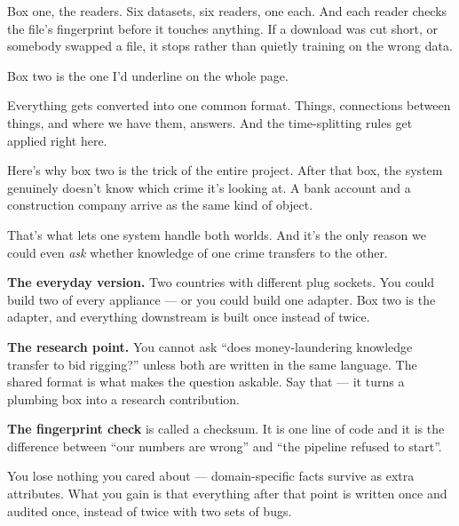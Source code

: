 \documentclass[11pt]{article}
\begin{document}
\begin{saythis}
Box one, the readers. Six datasets, six readers, one each. And each reader
checks the file's fingerprint before it touches anything. If a download was
cut short, or somebody swapped a file, it stops rather than quietly training on
the wrong data.

Box two is the one I'd underline on the whole page.

Everything gets converted into one common format. Things, connections between
things, and where we have them, answers. And the time-splitting rules get
applied right here.

Here's why box two is the trick of the entire project. After that box, the
system genuinely doesn't know which crime it's looking at. A bank account and a
construction company arrive as the same kind of object.

That's what lets one system handle both worlds. And it's the only reason we
could even \emph{ask} whether knowledge of one crime transfers to the other.
\end{saythis}

\begin{means}
\textbf{The everyday version.} Two countries with different plug sockets. You
could build two of every appliance --- or you could build one adapter. Box two
is the adapter, and everything downstream is built once instead of twice.

\textbf{The research point.} You cannot ask ``does money-laundering knowledge
transfer to bid rigging?'' unless both are written in the same language. The
shared format is what makes the question askable. Say that --- it turns a
plumbing box into a research contribution.

\textbf{The fingerprint check} is called a checksum. It is one line of code and
it is the difference between ``our numbers are wrong'' and ``the pipeline
refused to start''.
\end{means}

\begin{asked}
 You lose
nothing you cared about --- domain-specific facts survive as extra attributes.
What you gain is that everything after that point is written once and audited
once, instead of twice with two sets of bugs.
\end{asked}

\end{document}
